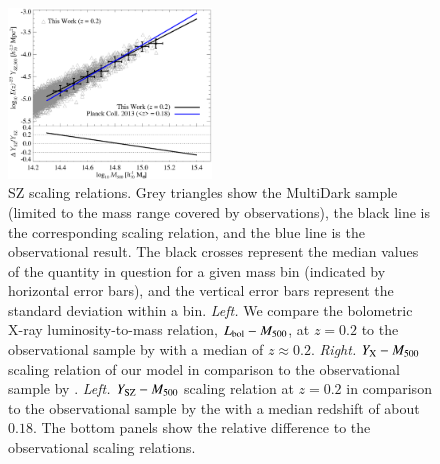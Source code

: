 \documentclass[useAMS,usenatbib]{mn2e}
\begin{document}
\begin{figure} 
\centering
\includegraphics[width=0.48\textwidth]{figures/sz_m.eps}
\caption{SZ scaling relations. Grey triangles show the MultiDark
  sample (limited to the mass range covered by observations), the black line is
  the corresponding scaling relation, and the blue line is the
  observational result. The black crosses represent the median values of the
  quantity in question for a given mass bin (indicated by horizontal error
  bars), and the vertical error bars represent the standard deviation within a
  bin.  \emph{Left.} We compare the bolometric X-ray luminosity-to-mass
  relation, $L_{{\mathrm{bol}}}-M_{500}$, at $z=0.2$ to the observational sample by
  \protect\cite{2010MNRAS.406.1773M} with a median of $z \approx 0.2$. 
  \emph{Right.} $Y_{{\mathrm{X}}}-M_{500}$ scaling relation of our model in comparison to the
  observational sample by \protect\cite{2010MNRAS.406.1773M}. 
  \emph{Left.} $Y_{{\mathrm{SZ}}}-M_{500}$ scaling relation at $z=0.2$ in comparison
  to the observational sample by the \protect\cite{2013arXiv1303.5080P} with a 
  median redshift of about $0.18$. The bottom panels show the relative difference to
  the observational scaling relations.}
\label{fig:SZ_M}
\end{figure}
\end{document}
